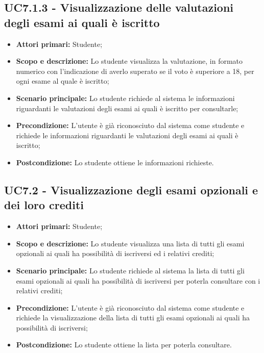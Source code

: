 \documentclass[AnalisiDeiRequisiti.tex]{subfiles}
\begin{document}
\subsection{UC7.1.3 - Visualizzazione delle valutazioni degli esami ai quali è iscritto}
\begin{itemize}
	\item \textbf{Attori primari:} Studente;\\
	\item \textbf{Scopo e descrizione:} Lo studente visualizza la valutazione, in formato numerico con l'indicazione di averlo superato se il voto è superiore a 18, per ogni esame al quale è iscritto;\\
	\item \textbf{Scenario principale:} Lo studente richiede al sistema le informazioni riguardanti le valutazioni degli esami ai quali è iscritto per consultarle;\\
	\item \textbf{Precondizione:} L'utente è già riconosciuto dal sistema come studente e richiede le informazioni riguardanti le valutazioni degli esami ai quali è iscritto;\\
	\item \textbf{Postcondizione:} Lo studente ottiene le informazioni richieste.\\
\end{itemize}

\subsection{UC7.2 - Visualizzazione degli esami opzionali e dei loro crediti}
\begin{itemize}
	\item \textbf{Attori primari:} Studente;\\
	\item \textbf{Scopo e descrizione:} Lo studente visualizza una lista di tutti gli esami opzionali ai quali ha possibilità di iscriversi ed i relativi crediti;\\
	\item \textbf{Scenario principale:} Lo studente richiede al sistema la lista di tutti gli esami opzionali ai quali ha possibilità di iscriversi per poterla consultare con i relativi crediti;\\
	\item \textbf{Precondizione:} L'utente è già riconosciuto dal sistema come studente e richiede la visualizzazione della lista di tutti gli esami opzionali ai quali ha possibilità di iscriversi;\\
	\item \textbf{Postcondizione:} Lo studente ottiene la lista per poterla consultare.\\
\end{itemize}
\end{document}

